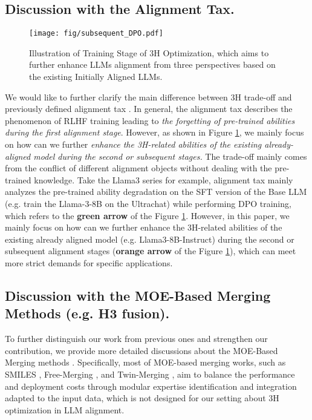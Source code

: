 \subsection{Discussion with the Alignment Tax.}
\begin{figure}[htbp]
    \centering
        \setlength{\abovecaptionskip}{0cm}   %
    \setlength{\belowcaptionskip}{0cm}   %
    \texttt{[image: fig/subsequent\_DPO.pdf]} %
    \caption{Illustration of Training Stage of 3H Optimization, which aims to further enhance LLMs alignment from three perspectives based on the existing Initially Aligned LLMs.}
    \label{fig:3H_stage}
\end{figure}
We would like to further clarify the main difference between 3H trade-off and previously defined alignment tax \cite{lin2024mitigating,lu2024online}. In general, the alignment tax describes the phenomenon of RLHF training leading to \emph{the forgetting of pre-trained abilities during the first alignment stage}. However, as shown in Figure \ref{fig:3H_stage}, we mainly focus on how can we further \emph{enhance the 3H-related abilities of the existing already-aligned model during the second or subsequent stages.} The trade-off mainly comes from the conflict of different alignment objects without dealing with the pre-trained knowledge. Take the Llama3 series for example, alignment tax mainly analyzes the pre-trained ability degradation on the SFT version of the Base LLM (e.g. train the Llama-3-8B on the Ultrachat) while performing DPO training, which refers to the \textbf{green arrow} of the Figure \ref{fig:3H_stage}. However, in this paper, we mainly focus on how can we further enhance the 3H-related abilities of the existing already aligned model (e.g. Llama3-8B-Instruct) during the second or subsequent alignment stages (\textbf{orange arrow} of the Figure \ref{fig:3H_stage}), which can meet more strict demands for specific applications.

\subsection{Discussion with the MOE-Based Merging Methods (e.g. H3 fusion).} To further distinguish our work from previous ones and strengthen our contribution, we provide more detailed discussions about the MOE-Based Merging methods \cite{zhao2024loraretriever,zhao2024merging,zhou2025mergeme}. Specifically, most of MOE-based merging works, such as SMILES \cite{tang2024smile}, Free-Merging \cite{zheng2024free}, and Twin-Merging \cite{zheng2024free}, aim to balance the performance and deployment costs through modular expertise identification and integration adapted to the input data, which is not designed for our setting about 3H optimization in LLM alignment. 

